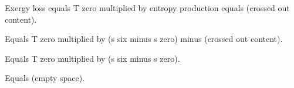 Exergy loss equals T zero multiplied by entropy production equals (crossed out content).  

Equals T zero multiplied by (s six minus s zero) minus (crossed out content).  

Equals T zero multiplied by (s six minus s zero).  

Equals (empty space).